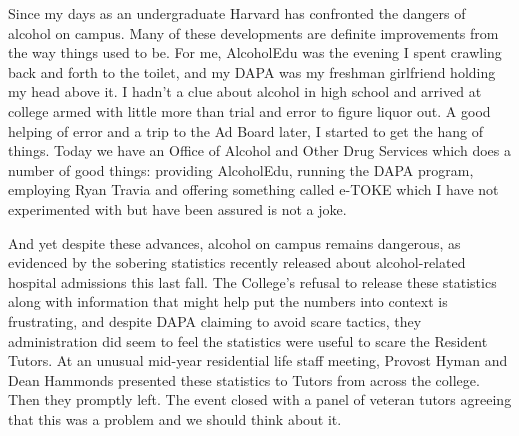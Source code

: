 Since my days as an undergraduate Harvard has confronted the dangers of
alcohol on campus. Many of these developments are definite improvements from
the way things used to be. For me, AlcoholEdu was the evening I spent
crawling back and forth to the toilet, and my DAPA was my freshman girlfriend
holding my head above it. I hadn't a clue about alcohol in high school and
arrived at college armed with little more than trial and error to figure
liquor out. A good helping of error and a trip to the Ad Board later, I
started to get the hang of things. Today we have an Office of Alcohol and
Other Drug Services which does a number of good things: providing AlcoholEdu,
running the DAPA program, employing Ryan Travia and offering something called
e-TOKE which I have not experimented with but have been assured is not a
joke.

And yet despite these advances, alcohol on campus remains dangerous, as
evidenced by the sobering statistics recently released about alcohol-related
hospital admissions this last fall. The College's refusal to release these
statistics along with information that might help put the numbers into
context is frustrating, and despite DAPA claiming to avoid scare tactics,
they administration did seem to feel the statistics were useful to scare the
Resident Tutors. At an unusual mid-year residential life staff meeting,
Provost Hyman and Dean Hammonds presented these statistics to Tutors from
across the college. Then they promptly left. The event closed with a panel of
veteran tutors agreeing that this was a problem and we should think about it.


